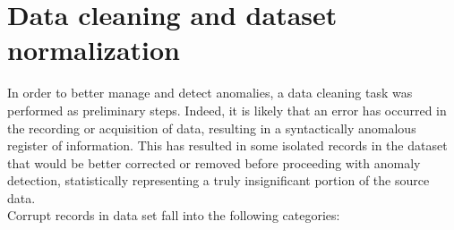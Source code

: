 \clearpage

\section{Data cleaning and dataset normalization}
\label{sec:cleaning}
    In order to better manage and detect anomalies, a data cleaning task was performed as preliminary steps.
    Indeed, it is likely that an error has occurred in the recording or acquisition of data, resulting in a syntactically anomalous register of information. This has resulted in some isolated records in the dataset that would be better corrected or removed before proceeding with anomaly detection, statistically representing a truly insignificant portion of the source data.
    \\
    Corrupt records in data set fall into the following categories:
